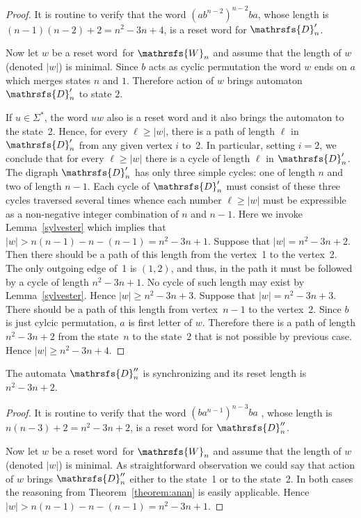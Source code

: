 \documentclass[11pt]{llncs}
\newcommand{\sw}{reset word}
\begin{document}
\begin{proof}
It is routine to verify that the word $(ab^{n - 2})^{n - 2}ba$, whose length
is $(n - 1)(n - 2) + 2 = n^2 -3n + 4$, is a reset word for $\mathrsfs{D}'_n$.

Now let $w$ be a \sw\ for $\mathrsfs{W}_n$ and assume that the length
of $w$ (denoted $|w|$) is minimal. 
Since $b$ acts as cyclic permutation the word $w$ ends on $a$ which merges 
states $n$ and $1$. Therefore action of $w$ brings automaton $\mathrsfs{D}'_n$ 
to state $2$.

If $u\in\Sigma^*$, the word $uw$ also is a reset word and it also
brings the automaton to the state~2. Hence, for every $\ell\ge|w|$,
there is a path of length $\ell$ in $\mathrsfs{D}'_n$ from any given vertex $i$
to~2. In particular, setting $i=2$, we conclude that for every
$\ell\ge|w|$ there is a cycle of length $\ell$ in $\mathrsfs{D}'_n$. The digraph
$\mathrsfs{D}'_n$ has only three simple cycles: one of length $n$ and two of length $n-1$.
Each cycle of $\mathrsfs{D}'_n$ must consist of these three cycles traversed several times
whence each number $\ell\ge|w|$ must be expressible as a non-negative integer
combination of $n$ and $n-1$. Here we invoke Lemma~\ref{sylvester} which
implies that $|w|>n(n-1)-n-(n-1)=n^2-3n+1$. Suppose that $|w|=n^2-3n+2$.
Then there should be a path of this length from the vertex~1 to the vertex~2.
The only outgoing edge of~1 is $(1,2)$, and thus, in the path it must be
followed by a cycle of length $n^2-3n+1$. No cycle of such length may
exist by  Lemma~\ref{sylvester}. Hence $|w|\ge n^2-3n+3$.
Suppose that $|w|=n^2-3n+3$. There should be a path of this length from vertex~$n - 1$ to the
vertex~2. Since $b$ is just cylcic permutation, $a$ is first letter of $w$.
Therefore there is a path of length $n^2-3n+2$ from the state~$n$ to the state~2 that
is not possible by previous case. Hence $|w|\ge n^2-3n+4$.
\end{proof}


\begin{theorem}
\label{theorem:new series3}
The automata $\mathrsfs{D}''_n$ is synchronizing and its reset length is
$n^2-3n+2$.
\end{theorem}

\begin{proof}
It is routine to verify that the word $(ba^{n - 1})^{n - 3}ba$ , whose length
is $n(n - 3) + 2 = n^2 -3n + 2$, is a reset word for $\mathrsfs{D}''_n$.

Now let $w$ be a \sw\ for $\mathrsfs{W}_n$ and assume that the length
of $w$ (denoted $|w|$) is minimal. 
As straightforward observation we could say that action of $w$ brings 
$\mathrsfs{D}''_n$ either to the state~1 or to the state~2. In both cases
the reasoning from Theorem~\ref{theorem:anan} is easily applicable.
Hence $|w|>n(n-1)-n-(n-1)=n^2-3n+1$.
\end{proof}
\end{document}
